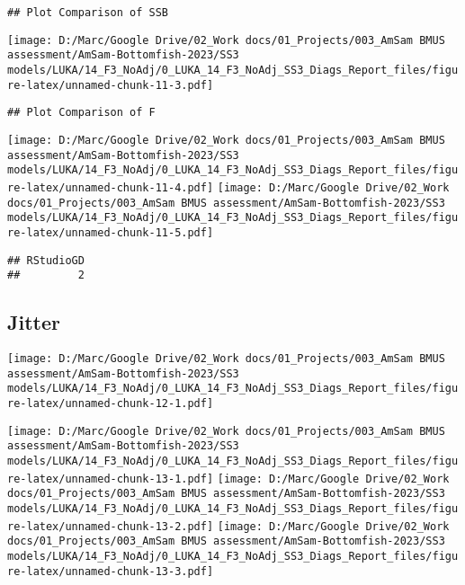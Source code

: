 \documentclass[
]{article}
\begin{document}
\begin{verbatim}
## Plot Comparison of SSB
\end{verbatim}

\texttt{[image: D:/Marc/Google Drive/02\_Work docs/01\_Projects/003\_AmSam BMUS assessment/AmSam-Bottomfish-2023/SS3 models/LUKA/14\_F3\_NoAdj/0\_LUKA\_14\_F3\_NoAdj\_SS3\_Diags\_Report\_files/figure-latex/unnamed-chunk-11-3.pdf]}

\begin{verbatim}
## Plot Comparison of F
\end{verbatim}

\texttt{[image: D:/Marc/Google Drive/02\_Work docs/01\_Projects/003\_AmSam BMUS assessment/AmSam-Bottomfish-2023/SS3 models/LUKA/14\_F3\_NoAdj/0\_LUKA\_14\_F3\_NoAdj\_SS3\_Diags\_Report\_files/figure-latex/unnamed-chunk-11-4.pdf]}
\texttt{[image: D:/Marc/Google Drive/02\_Work docs/01\_Projects/003\_AmSam BMUS assessment/AmSam-Bottomfish-2023/SS3 models/LUKA/14\_F3\_NoAdj/0\_LUKA\_14\_F3\_NoAdj\_SS3\_Diags\_Report\_files/figure-latex/unnamed-chunk-11-5.pdf]}

\begin{verbatim}
## RStudioGD 
##         2
\end{verbatim}

\hypertarget{jitter}{%
\subsection{Jitter}\label{jitter}}

\texttt{[image: D:/Marc/Google Drive/02\_Work docs/01\_Projects/003\_AmSam BMUS assessment/AmSam-Bottomfish-2023/SS3 models/LUKA/14\_F3\_NoAdj/0\_LUKA\_14\_F3\_NoAdj\_SS3\_Diags\_Report\_files/figure-latex/unnamed-chunk-12-1.pdf]}

\texttt{[image: D:/Marc/Google Drive/02\_Work docs/01\_Projects/003\_AmSam BMUS assessment/AmSam-Bottomfish-2023/SS3 models/LUKA/14\_F3\_NoAdj/0\_LUKA\_14\_F3\_NoAdj\_SS3\_Diags\_Report\_files/figure-latex/unnamed-chunk-13-1.pdf]}
\texttt{[image: D:/Marc/Google Drive/02\_Work docs/01\_Projects/003\_AmSam BMUS assessment/AmSam-Bottomfish-2023/SS3 models/LUKA/14\_F3\_NoAdj/0\_LUKA\_14\_F3\_NoAdj\_SS3\_Diags\_Report\_files/figure-latex/unnamed-chunk-13-2.pdf]}
\texttt{[image: D:/Marc/Google Drive/02\_Work docs/01\_Projects/003\_AmSam BMUS assessment/AmSam-Bottomfish-2023/SS3 models/LUKA/14\_F3\_NoAdj/0\_LUKA\_14\_F3\_NoAdj\_SS3\_Diags\_Report\_files/figure-latex/unnamed-chunk-13-3.pdf]}

\hypertarget{section}{%
\subsection{}\label{section}}
\end{document}
